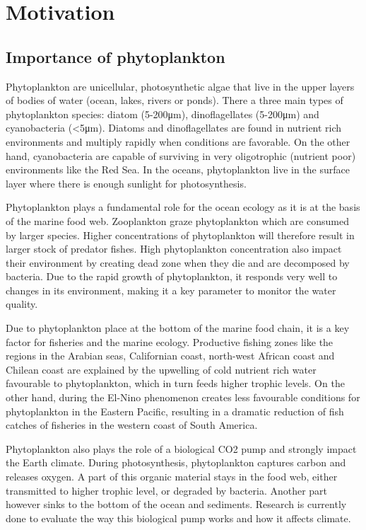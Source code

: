 

\chapter{Motivation}

\section{Importance of phytoplankton}

Phytoplankton are unicellular, photosynthetic algae that live in the upper layers of bodies of water (ocean, lakes, rivers or ponds). There a three main types of phytoplankton species: diatom (5-200μm), dinoflagellates (5-200μm) and cyanobacteria (<5μm). Diatoms and dinoflagellates are found in nutrient rich environments and multiply rapidly when conditions are favorable. On the other hand, cyanobacteria are capable of surviving in very oligotrophic (nutrient poor) environments like the Red Sea. In the oceans, phytoplankton live in the surface layer where there is enough sunlight for photosynthesis. 

Phytoplankton plays a fundamental role for the ocean ecology as it is at the basis of the marine food web. Zooplankton graze phytoplankton which are consumed by larger species. Higher concentrations of phytoplankton will therefore result in larger stock of predator fishes. High phytoplankton concentration also impact their environment by creating dead zone when they die and are decomposed by bacteria. Due to the rapid growth of phytoplankton, it responds very well to changes in its environment, making it a key parameter to monitor the water quality.

Due to phytoplankton place at the bottom of the marine food chain, it is a key factor for fisheries and the marine ecology. Productive fishing zones like the regions in the Arabian seas, Californian coast, north-west African coast and Chilean coast are explained by the upwelling of cold nutrient rich water favourable to phytoplankton, which in turn feeds higher trophic levels. On the other hand, during the El-Nino phenomenon creates less favourable conditions for phytoplankton in the Eastern Pacific, resulting in a dramatic reduction of fish catches of fisheries in the western coast of South America.

Phytoplankton also plays the role of a biological CO2 pump and strongly impact the Earth climate. During photosynthesis, phytoplankton captures carbon and releases oxygen. A part of this organic material stays in the food web, either transmitted to higher trophic level, or degraded  by bacteria. Another part however sinks to the bottom of the ocean and sediments. Research is currently done to evaluate the way this biological pump works and how it affects climate. 

